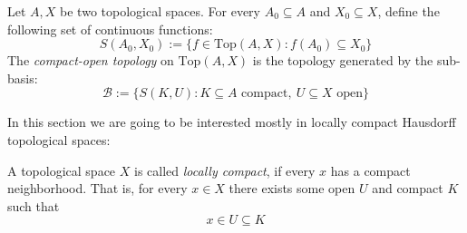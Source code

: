 \begin{definition} Let $A,X$ be two topological spaces. For every $A_0\subseteq A$ and $X_0\subseteq X$, define the following set of continuous functions:
\[S(A_0,X_0):=\big\{f\in\mathrm{Top}(A,X):f(A_0)\subseteq X_0\big\}\]
The \emph{compact-open topology} on $\mathrm{Top}(A,X)$ is the topology generated by the sub-basis:
\[\mathcal{B}:=\big\{S(K,U):K\subseteq A\text{ compact},\ U\subseteq X\text{ open}\big\}\]
\end{definition}

In this section we are going to be interested mostly in locally compact Hausdorff topological spaces:
\begin{definition} A topological space $X$ is called \emph{locally compact}, if every $x$ has a compact neighborhood. That is, for every $x\in X$ there exists some open $U$ and compact $K$ such that
\[x\in U\subseteq K\]
\end{definition}

